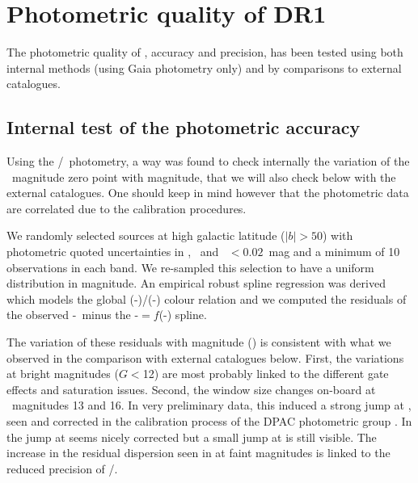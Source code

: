 \section{Photometric quality of DR1}\label{photoqual}

The photometric quality of {}, accuracy and precision, 
has been tested using both internal methods 
(using Gaia photometry only) and by comparisons to external catalogues.

\subsection{Internal test of the photometric accuracy}

Using the \gbp/\grp~photometry, a way was found to check internally the variation of the \gmag~magnitude zero point with magnitude, that we will also check below with the external catalogues. 
One should keep in mind however that the {\gaia} photometric data are correlated due to the calibration procedures. 

We randomly selected sources at high galactic latitude ($\vert b \vert>50$\deg) with photometric quoted uncertainties in \gmag, \gbp~and \grp~$<0.02$~mag and a minimum of 10 observations in each band. We re-sampled this selection to have a uniform distribution in magnitude. An empirical robust spline regression was derived which models the global (\gbp-\grp)/(\gmag-\grp) colour relation
and we computed the residuals of the observed \gmag-\grp\ minus the \gmag-\grp $=f$(\gbp-\grp) spline.

The variation of these residuals with magnitude () is consistent with what we observed in the comparison with external catalogues below. First, the variations at bright magnitudes ($G<$12) are most probably linked to the different gate effects and saturation issues. 
Second, the window size changes on-board at \gmag~magnitudes 13 and 16. In very preliminary data, this induced  a strong jump at , seen and corrected in the calibration process of the DPAC photometric group \citep{DPACP-9}. In {} the jump at  seems nicely corrected but a small jump at  is still visible. The increase in the residual dispersion seen in  at faint magnitudes is linked to the reduced precision of \gbp/\grp. 

